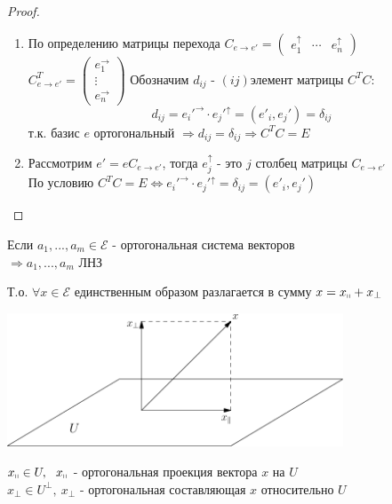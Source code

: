 \begin{proof} \tab
    \begin{enumerate}
        \item По определению матрицы перехода $C_{e \to e'} = \begin{pmatrix}
            e_1^\uparrow & \cdots & e_n^\uparrow
        \end{pmatrix}$\\
        $C^T_{e\to e'} = \begin{pmatrix}
            e_1^\rightarrow  \\ \vdots \\ e_n^\rightarrow 
        \end{pmatrix}$ Обозначим $d_{ij}$ - $(ij)$элемент матрицы $C^TC:$ 
        $$d_{ij} = e_i'^{\rightarrow} \cdot e_j'^{\uparrow} = (e'_i,e_j') = \delta_{ij}$$
        т.к. базис $e$  ортогональный $\Longrightarrow d_{ij} = \delta_{ij} \Longrightarrow C^TC = E$
        \item Рассмотрим $e' = eC_{e\to e'}$, тогда $e_j^{\uparrow}$ - это $j$ столбец матрицы $C_{e\to e'}$\\
        По условию $C^TC = E \Longleftrightarrow e_i'^{\rightarrow} \cdot e_j'^{\uparrow} = \delta_{ij} = (e'_i,e_j')$
    \end{enumerate}    
\end{proof}
\begin{lemma}
    Если $a_1,...,a_m \in \mathcal{E}$ - ортогональная система векторов\\ 
    \tab[13cm] $\Longrightarrow  a_1,...,a_m$ ЛНЗ  
\end{lemma}
Т.о. $\forall x \in \mathcal{E}$ единственным образом разлагается в сумму $x = x_{\shortparallel} + x_{\perp}$
\begin{center}
    \includegraphics[width=10cm]{image/Asymptote/3/linal-3-1.pdf}
\end{center}
$x_{\shortparallel} \in U, \ \ x_{\shortparallel}$ - ортогональная проекция вектора $x$ на $U$\\
$x_{\perp} \in U^{\perp}, \ x_{\perp}$ - ортогональная составляющая $x$ относительно $U$
